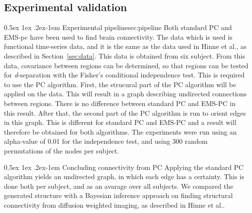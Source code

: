 \documentclass[a4paper, 10pt, english, onecolumn]{article}
\makeatletter
\renewcommand{\paragraph}{%
  \@startsection{paragraph}{4}%
  {\z@}{0.5ex \@plus 1ex \@minus .2ex}{-1em}%
  {\normalfont\normalsize\bfseries}%
}
\makeatother
\begin{document}
\subsection{Experimental validation}
\paragraph{Experimental pipeline}{sec:pipeline}
Both standard PC and EMS-pc have been used to find brain connectivity.
The data which is used is functional time-series data, and it is the same as the data used in Hinne et al.\cite{hinne2013}, as described in Section~\ref{sec:data}.
This data is obtained from six subject.
From this data, covariance between regions can be determined, so that regions can be tested for \emph{d}-separation with the Fisher's conditional independence test.
This is required to use the PC algorithm.
First, the strucural part of the PC algorithm will be applied on the data.
This will result in a graph describing undirected connections between regions.
There is no difference between standard PC and EMS-PC in this result.
After that, the second part of the PC algorithm is run to orient edges in this graph.
This is different for standard PC and EMS-PC and a result will therefore be obtained for both algorithms.
The experiments were run using an alpha-value of 0.01 for the independence test, and using 300 random permutations of the nodes per subject.

\paragraph{Concluding connectivity from PC}
Applying the standard PC algorithm yields an undirected graph, in which each edge has a certainty.
This is done both per subject, and as an avarage over all subjects.
We compared the generated structure with a Bayesian inference approach on finding structural connectivity from diffusion weighted imaging, as described in Hinne et al.\cite{hinne2013}.
\end{document}
